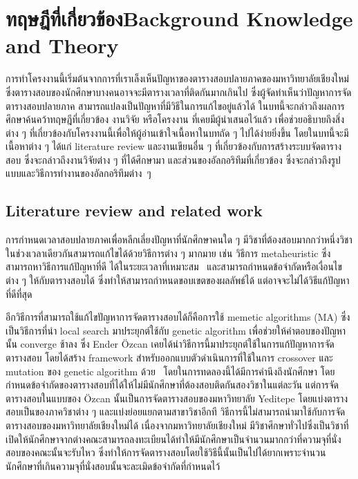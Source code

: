 \chapter{\ifcpe ทฤษฎีที่เกี่ยวข้อง\else Background Knowledge and Theory\fi}

การทำโครงงานนี้เริ่มต้นจากการที่เราเล็งเห็นปัญหาของตารางสอบปลายภาคของมหาวิทยาลัยเชียงใหม่ 
ซึ่งตารางสอบของนักศึกษาบางคนอาจจะมีตารางเวลาที่ติดกันมากเกินไป ซึ่งผู้จัดทำเห็นว่าปัญหาการจัดตารางสอบปลายภาค
สามารถแปลงเป็นปัญหาที่มีวิธีในการแก้ไขอยู่แล้วได้ ในบทนี้จะกล่าวถึงผลการศึกษาค้นคว้าทฤษฎีที่เกี่ยวข้อง งานวิจัย หรือโครงงาน ที่เคยมีผู้นำเสนอไว้แล้ว
เพื่อช่วยอธิบายถึงสิ่งต่าง ๆ ที่เกี่ยวข้องกับโครงงานนี้เพื่อให้ผู้อ่านเข้าใจเนื้อหาในบทถัด ๆ ไปได้ง่ายยิ่งขึ้น โดยในบทนี้จะมีเนื้อหาต่าง ๆ ได้แก่ literature review 
และงานเขียนอื่น ๆ ที่เกี่ยวข้องกับการสร้างระบบจัดตารางสอบ
ซึ่งจะกล่าวถึงงานวิจัยต่าง ๆ ที่ได้ศึกษามา และส่วนของอัลกอริทึมที่เกี่ยวข้อง ซึ่งจะกล่าวถึงรูปแบบและวิธีการทำงานของอัลกอริทึมต่าง~ๆ 

\section{Literature review and related work}
การกำหนดเวลาสอบปลายภาคเพื่อหลีกเลี่ยงปัญหาที่นักศึกษาคนใด ๆ มีวิชาที่ต้องสอบมากกว่าหนึ่งวิชาในช่วงเวลาเดียวกันสามารถแก้ไขได้ด้วยวิธีการต่าง ๆ มากมาย
เช่น วิธีการ metaheuristic ซึ่งสามารถหาวิธีการแก้ปัญหาที่ดี ได้ในระยะเวลาที่เหมาะสม~\cite{meta-for-vertexcolor}
และสามารถกำหนดข้อจำกัดหรือเงื่อนไขต่าง ๆ ให้กับตารางสอบได้ ซึ่งทำให้สามารถกำหนดขอบเขตของผลลัพธ์ได้ แต่อาจจะไม่ได้วิธีแก้ปัญหาที่ดีที่สุด

อีกวิธีการที่สามารถใช้แก้ไขปัญหาการจัดตารางสอบได้ก็คือการใช้ memetic algorithms (MA) ซึ่งเป็นวิธีการที่นำ local search มาประยุกต์ใช้กับ genetic algorithm 
เพื่อช่วยให้คำตอบของปัญหานั้น converge ช้าลง \cite{pablo-memetic-algo} ซึ่ง Ender {\"O}zcan เคยได้นำวิธีการนี้มาประยุกต์ใช้ในการแก้ปัญหาการจัดตารางสอบ 
โดยได้สร้าง framework สำหรับออกแบบตัวดำเนินการที่ใช้ในการ crossover และ mutation ของ genetic algorithm ด้วย~\cite{fes}
โดยในการทดลองนี้ได้มีการคำนึงถึงนักศึกษา โดยกำหนดข้อจำกัดของตารางสอบที่ได้ให้ไม่มีนักศึกษาที่ต้องสอบติดกันสองวิชาในแต่ละวัน แต่การจัดตารางสอบในแบบของ {\"O}zcan 
นั้นเป็นการจัดตารางสอบของมหาวิทยาลัย Yeditepe โดยแบ่งตารางสอบเป็นของภาควิชาต่าง ๆ และแบ่งย่อยแยกตามสาขาวิชาอีกที วิธีการนี้ไม่สามารถนำมาใช้กับการจัดตารางสอบของมหาวิทยาลัยเชียงใหม่ได้
เนื่องจากมหาวิทยาลัยเชียงใหม่ มีวิชาศึกษาทั่วไปซึ่งเป็นวิชาที่เปิดให้นักศึกษาจากต่างคณะสามารถลงทะเบียนได้ทำให้มีนักศึกษาเป็นจำนวนมากกว่าที่ความจุที่นั่งสอบของคณะนั้นจะรับไหว
ซึ่งทำให้การจัดตารางสอบโดยใช้วิธีนี้นั้นเป็นไปได้ยากเพราะจำนวนนักศึกษาที่เกินความจุที่นั่งสอบนั้นจะละเมิดข้อจำกัดที่กำหนดไว้ 

